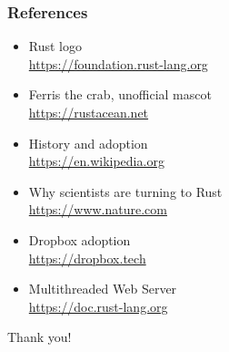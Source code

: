 \documentclass{beamer}
\begin{document}
\begin{frame}
\frametitle{References}
\begin{itemize}
\item Rust logo\\
\href{https://foundation.rust-lang.org/policies/logo-policy-and-media-guide/\#the-rust-trademarks}{https://foundation.rust-lang.org}
\item Ferris the crab, unofficial mascot\\
\href{https://rustacean.net}{https://rustacean.net}
\item History and adoption\\
\href{https://en.wikipedia.org/wiki/Rust_(programming_language)}{https://en.wikipedia.org}

\item Why scientists are turning to Rust\\
\href{https://www.nature.com/articles/d41586-020-03382-2}{https://www.nature.com}
\item Dropbox adoption\\
\href{https://dropbox.tech/infrastructure/rewriting-the-heart-of-our-sync-engine}{https://dropbox.tech}


\item Multithreaded Web Server\\
\href{https://doc.rust-lang.org/stable/book/ch20-00-final-project-a-web-server.html}{https://doc.rust-lang.org}
\end{itemize}
\end{frame}

\begin{frame}
\Huge{\centerline{Thank you!}}
\end{frame}
\end{document}

